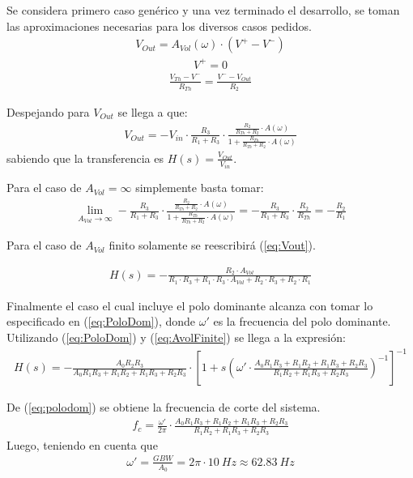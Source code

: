 Se considera primero caso genérico y una vez terminado el desarrollo, se toman las aproximaciones necesarias para los diversos casos pedidos.
\begin{align}
V_{Out}= A_{Vol}(\omega) \cdot (V^+ - V^-)
\label{equ:avoligualvo}
\end{align}
\begin{align}
V^+=0\end{align}
\begin{align}\frac{V_{Th}-V^-}{R_{Th}}=\frac{V^--V_{Out}}{R_2}
\label{eq:nodeInv}
\end{align}

Despejando para $V_{Out}$ se llega a que:
\begin{align}
\label{eq:Vout}
V_{Out}=-V_{in} \cdot \frac{R_3}{R_1+R_3} \cdot \frac{\frac{R_2}{R_{Th}+R_2}\cdot A(\omega)}{1+\frac{R_{Th}}{R_{Th}+R_2}\cdot A(\omega)}
\end{align}
sabiendo que la transferencia es $ H(s)=\frac{V_{Out}}{V_{in}} $.

Para el caso de $A_{Vol}=\infty$ simplemente basta tomar:
\begin{align}\lim_{A_{Vol}\to\infty} - \frac{R_3}{R_1+R_3} \cdot \frac{\frac{R_2}{R_{Th}+R_2}\cdot A(\omega)}{1+\frac{R_{Th}}{R_{Th}+R_2}\cdot A(\omega)} = -\frac{R_3}{R_1+R_3}\cdot\frac{R_2}{R_{Th}}=-\frac{R_2}{R_1}\end{align}

Para el caso de $A_{Vol}$ finito solamente se reescribirá (\ref{eq:Vout}).

\begin{align}
H(s)= -\frac{R_2\cdot A_{Vol}}{R_1\cdot R_3+R_1\cdot R_3 \cdot A_{Vol} +R_2\cdot R_3+R_2\cdot R_1}
\label{eq:AvolFinite}
\end{align}

Finalmente el caso el cual incluye el polo dominante alcanza con tomar lo especificado en (\ref{eq:PoloDom}), donde $\omega'$ es la frecuencia del polo dominante. Utilizando (\ref{eq:PoloDom}) y (\ref{eq:AvolFinite}) se llega a la expresión:
\begin{align}
\label{eq:polodom}
H(s)=-\frac{A_0R_2R_3}{A_0R_1R_3+R_1R_2+R_1R_3+R_2R_3} \cdot \left[1+s \left( \omega' \cdot \frac{A_0R_1R_3+R_1R_2+R_1R_3+R_2R_3}{R_1R_2+R_1R_3+R_2R_3} \right)^{-1} \right]^{-1}
\end{align}

De (\ref{eq:polodom}) se obtiene la frecuencia de corte del sistema.
\begin{align}
f_c=\frac{\omega'}{2\pi} \cdot \frac{A_0R_1R_3+R_1R_2+R_1R_3+R_2R_3}{R_1R_2+R_1R_3+R_2R_3}
\end{align}
Luego, teniendo en cuenta que
\begin{align}
\omega'=\frac{GBW}{A_0} = 2 \pi\cdot 10 \ Hz \approx 62.83 \ Hz
\end{align}

